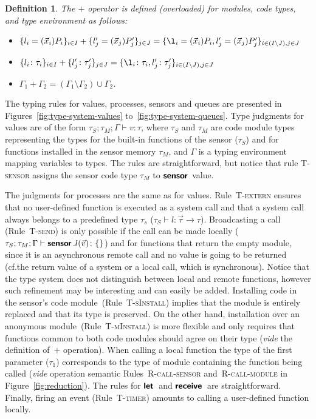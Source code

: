 \documentclass[copyright,creativecommons]{eptcs}
\newcommand{\keyw}[1]{\textbf{\textsf{#1}}\,}
\newcommand{\letk}{\keyw{let}}
\newcommand{\receivek}{\keyw{receive}}
\newcommand{\branek}{\keyw{sensor}}
\newcommand{\invk}[3]{{#1}.{#2}({#3})}
\def\obj#1{\{#1\}}
\newcommand{\functionType}[2]{{#1} \rightarrow {#2}}
\newcommand{\functionTyped}{\functionType {\vec \tau} {\tau}}
\newcommand{\mkRrule}[1]{{\footnotesize \textsc{R-#1}}}
\newcommand{\mkTrule}[1]{{\footnotesize \textsc{T-#1}}}
\newcommand{\RcallS}{\mkRrule{call-sensor}}
\newcommand{\RcallM}{\mkRrule{call-module}}
\newcommand{\type}{\vdash}
\newcommand{\Tfire}{\mkTrule{timer}}
\newcommand{\TsCall}{\mkTrule{extern}}
\newcommand{\TinstS}{\mkTrule{sInstall}}
\newcommand{\TinstM}{\mkTrule{mInstall}}
\newcommand{\Tbcast}{\mkTrule{send}}
\newcommand{\TVsensor}{\mkTrule{sensor}}
\newcommand{\seqSets}[3]{{#1}; {#2}; {#3}}
\newcommand{\seqSetsd}{\seqSets {\tau_S} {\tau_M} {\Gamma}}
\newtheorem{definition}{Definition}
\begin{document}
\begin{definition}
  \label{def:plus}
  The $+$ operator is defined (overloaded) for modules, code types, and
  type environment as follows:
  \begin{itemize}
  \item $\obj{l_i = (\vec x_i) P_i}_{i \in I} + \obj{l'_j = (\vec x_j) P'_j}_{j \in J} =
    \obj{\l_i = (\vec x_i) P_i, l'_j = (\vec x_j) P'_j}_{i \in (I \setminus J), j \in J}$
  \item $\obj{l_i \colon \tau_i}_{i \in I} + \obj{l'_j \colon \tau'_j}_{j \in J} =
    \obj{\l_i \colon \tau_i, l'_j \colon \tau'_j}_{i \in (I \setminus J), j \in J}$
  \item $\Gamma_1 + \Gamma_2 = (\Gamma_1 \setminus \Gamma_2) \cup
    \Gamma_2$.
  \end{itemize}
\end{definition}



The typing rules for values, processes, sensors and queues are
presented in Figures~\ref{fig:type-system-values}
to~\ref{fig:type-system-queues}.
Type judgments for values are of the form $\seqSetsd \type v \colon
\tau$, where $\tau_S$ and $\tau_M$ are code module types
representing the types for the built-in functions of the sensor ($\tau_S$) and
for functions installed in the sensor memory $\tau_M$, and $\Gamma$ is a 
typing environment mapping variables to types.
The rules are straightforward, but notice that rule \TVsensor{} assigns the 
sensor code type $\tau_M$ to $\branek$ value.


The judgments for processes are the same as for values.
Rule~\TsCall{} ensures that no user-defined function is executed as a
system call and that a system call always belongs to a predefined
type $\tau_s$ ($\tau_S \type l \colon \functionTyped$).
Broadcasting a call (Rule~\Tbcast{}) is only possible if the call can
be made locally ($\seqSetsd \type \invk \branek l {\vec v} \colon \obj{}$)
and for functions that return the empty module, since it is an
asynchronous remote call and no value is going to be returned
(cf.\@ the return value of a system or a local call, which is synchronous).
Notice that the type system does not distinguish between 
local and remote functions, however such refinement may be 
interesting and can easily be added.
Installing code in the sensor's code module~(Rule~\TinstS) 
implies that the module is entirely replaced and that its type is preserved.
On the other hand, installation over an anonymous 
module~(Rule~\TinstM) is more flexible and only requires that
functions common to both code modules should agree
on their type (\textit{vide} the definition of~$+$ operation).
When calling a local function the type of the first parameter
($\tau_1$) corresponds to the type of module containing the function 
being called (\textit{vide} operation semantic Rules~\RcallS{} and~\RcallM{}
in Figure~\ref{fig:reduction}).
The rules for $\letk$ and $\receivek$ are straightforward.
Finally, firing an event (Rule~\Tfire{}) amounts to calling a user-defined
function locally.
\end{document}
